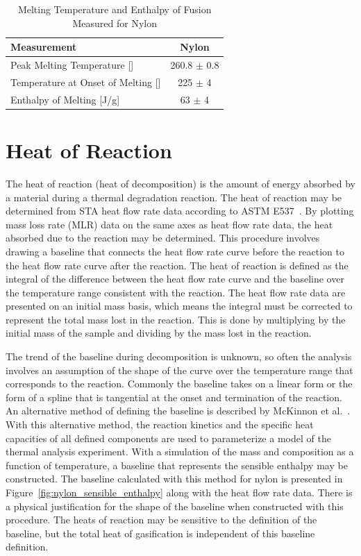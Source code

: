 \documentclass[12pt,oneside]{book}
\begin{document}
\begin{table}[!ht]{}
\centering
\caption[Melting Temperature and Enthalpy of Fusion Measured for Nylon]{Melting Temperature and Enthalpy of Fusion Measured for Nylon}
{\begin{tabular}{lc}
\toprule
Measurement       & Nylon   \\
\midrule
Peak Melting Temperature [\degC{ }]       			& 260.8 $\pm$ 0.8		\\ 
Temperature at Onset of Melting [\degC{ }]			& 225 $\pm$ 4			\\
Enthalpy of Melting [J/g]							& 63 $\pm$ 4			\\
\bottomrule
\end{tabular}}
\label{tab:melting}
\end{table}

\section{Heat of Reaction}

The heat of reaction (heat of decomposition) is the amount of energy absorbed by a material during a thermal degradation reaction. The heat of reaction may be determined from STA heat flow rate data according to ASTM E537~\cite{ASTM_E537}. By plotting mass loss rate (MLR) data on the same axes as heat flow rate data, the heat absorbed due to the reaction may be determined. This procedure involves drawing a baseline that connects the heat flow rate curve before the reaction to the heat flow rate curve after the reaction. The heat of reaction is defined as the integral of the difference between the heat flow rate curve and the baseline over the temperature range consistent with the reaction. The heat flow rate data are presented on an initial mass basis, which means the integral must be corrected to represent the total mass lost in the reaction. This is done by multiplying by the initial mass of the sample and dividing by the mass lost in the reaction. 

The trend of the baseline during decomposition is unknown, so often the analysis involves an assumption of the shape of the curve over the temperature range that corresponds to the reaction. Commonly the baseline takes on a linear form or the form of a spline that is tangential at the onset and termination of the reaction. An alternative method of defining the baseline is described by McKinnon et al.~\cite{McKinnon_2013}. With this alternative method, the reaction kinetics and the specific heat capacities of all defined components are used to parameterize a model of the thermal analysis experiment. With a simulation of the mass and composition as a function of temperature, a baseline that represents the sensible enthalpy may be constructed. The baseline calculated with this method for nylon is presented in Figure~\ref{fig:nylon_sensible_enthalpy} along with the heat flow rate data. There is a physical justification for the shape of the baseline when constructed with this procedure. The heats of reaction may be sensitive to the definition of the baseline, but the total heat of gasification is independent of this baseline definition.
\end{document}
